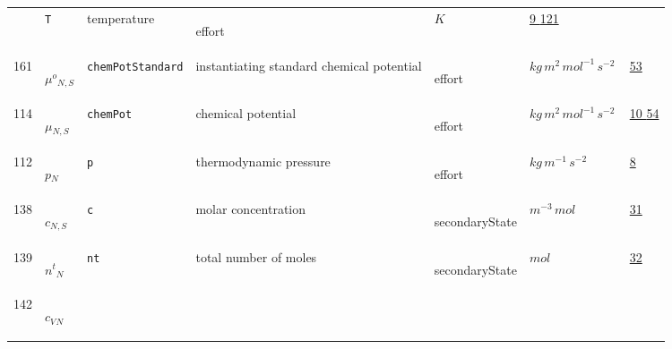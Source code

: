 \begin{longtable}{|p{1cm}|p{2.5cm}|p{4.5cm}|p{8cm}|p{3.0cm}|p{3cm}|p{1cm}|}
             & \verb|T|
             & temperature
             & \begin{lay}effort \end{lay}
             & $ K \, $
             &                 \hyperlink{"e:9"}{ 9 }
                                 \hyperlink{"e:121"}{ 121 }
                 \\
            161
             & \hypertarget{"v:161"}{ $ {{\mu^o}}{_{N, S}} $}
             & \verb|chemPotStandard|
             & instantiating standard chemical potential
             & \begin{lay}effort \end{lay}
             & $ kg \,m^{2} \,mol^{-1} \,s^{-2} \, $
             &                 \hyperlink{"e:53"}{ 53 }
                 \\
            114
             & \hypertarget{"v:114"}{ $ {{\mu}}{_{N, S}} $}
             & \verb|chemPot|
             & chemical potential
             & \begin{lay}effort \end{lay}
             & $ kg \,m^{2} \,mol^{-1} \,s^{-2} \, $
             &                 \hyperlink{"e:10"}{ 10 }
                                 \hyperlink{"e:54"}{ 54 }
                 \\
            112
             & \hypertarget{"v:112"}{ $ {p}{_{N}} $}
             & \verb|p|
             & thermodynamic pressure
             & \begin{lay}effort \end{lay}
             & $ kg \,m^{-1} \,s^{-2} \, $
             &                 \hyperlink{"e:8"}{ 8 }
                 \\
            138
             & \hypertarget{"v:138"}{ $ {c}{_{N, S}} $}
             & \verb|c|
             & molar concentration
             & \begin{lay}secondaryState \end{lay}
             & $ m^{-3} \,mol \, $
             &                 \hyperlink{"e:31"}{ 31 }
                 \\
            139
             & \hypertarget{"v:139"}{ $ {{n^t}}{_{N}} $}
             & \verb|nt|
             & total number of moles
             & \begin{lay}secondaryState \end{lay}
             & $ mol \, $
             &                 \hyperlink{"e:32"}{ 32 }
                 \\
            142
             & \hypertarget{"v:142"}{ $ {{c_V}}{_{N}} $}

\end{longtable}
